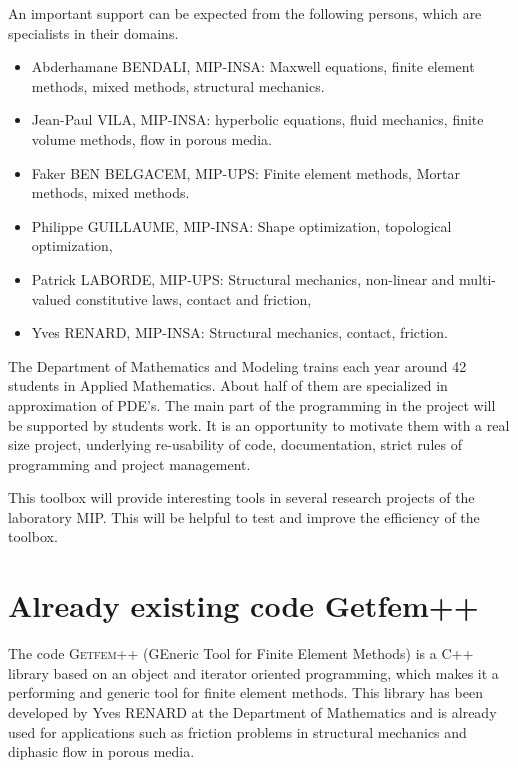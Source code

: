 \documentclass[11pt,a4paper]{article}
\begin{document}
An important support can be expected from the following persons, which are
specialists in their domains.
\begin{itemize}
\item  Abderhamane BENDALI, MIP-INSA: Maxwell equations, finite element
methods, mixed methods, structural mechanics. 

\item  Jean-Paul VILA, MIP-INSA: hyperbolic equations, fluid mechanics,
finite volume methods, flow in porous media. 

\item  Faker BEN BELGACEM, MIP-UPS: Finite element methods, Mortar methods,
mixed methods. 

\item  Philippe GUILLAUME, MIP-INSA: Shape optimization, topological
optimization, 

\item  Patrick LABORDE, MIP-UPS: Structural mechanics, non-linear and
multi-valued constitutive laws, contact and friction,

\item  Yves RENARD, MIP-INSA: Structural mechanics, contact, friction.%
\end{itemize}

The Department of Mathematics and Modeling trains each year around 42
students in Applied Mathematics. About half of them are specialized in
approximation of PDE's. The main part of the programming in the project will
be supported by students work. It is an opportunity to motivate them with a
real size project, underlying re-usability of code, documentation, strict
rules of programming and project management. 

This toolbox will provide interesting tools in several research projects of
the laboratory MIP. This  will be helpful to test and improve the efficiency
of the toolbox. 

\section{Already existing code Getfem++}

The code \textsc{Getfem++} (GEneric Tool for Finite Element Methods) is a
C++ library based on an object and iterator oriented programming, which
makes it a performing and generic tool for finite element methods. This
library has been developed by Yves RENARD at the Department of Mathematics
and is already used for applications such as friction problems in structural 
mechanics and diphasic flow in porous media. 
\end{document}
